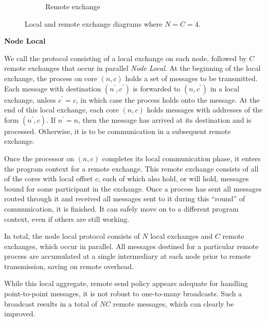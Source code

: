 \documentclass{report}
\begin{document}
\begin{figure}
\begin{center}
\begin{subfigure}{0.53\linewidth}
			\caption{Remote exchange \label{fig:remote_exchange}}
		\end{subfigure}
		\caption{Local and remote exchange diagrams where $N = C = 4$. \label{fig:exchange}}
	\end{center}
\end{figure}


\bigskip
\noindent
\textbf{Node Local}

\noindent
We call the protocol consisting of a local exchange on each node, followed by $C$ remote exchanges that occur in parallel \emph{Node Local}.
%
%
At the beginning of the local exchange, the process on core $(n,c)$ holds a set of messages to be transmitted.
Each message with destination $(n^\prime, c^\prime)$ is forwarded to $(n, c^\prime)$ in a local exchange, unless $c^\prime = c$, in which case the process holds onto the message.
At the end of this local exchange, each core $(n,c)$ holds messages with addresses of the form $(n^\prime, c)$.
If $n^\prime = n$, then the message has arrived at its destination and is processed. 
Otherwise, it is to be communication in a subsequent remote exchange.

Once the processor on $(n, c)$ completes its local communication phase, it enters the program context for a remote exchange.
This remote exchange consists of all of the cores with local offset $c$, each of which also hold, or will hold, messages bound for some participant in the exchange.
Once a process has sent all messages routed through it and received all messages sent to it during this ``round'' of communication, it is finished. 
It can safely move on to a different program context, even if others are still working. 

In total, the node local protocol consists of $N$ local exchanges and $C$ remote exchanges, which occur in parallel. 
All messages destined for a particular remote process are accumulated at a single intermediary at each node prior to remote transmission, saving on remote overhead.

While this local aggregate, remote send policy appears adequate for handling point-to-point messages, it is not robust to one-to-many broadcasts.
Such a broadcast results in a total of $NC$ remote messages, which can clearly be improved. 
\end{document}
